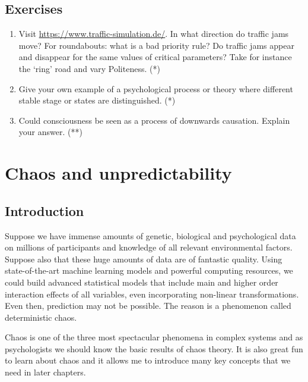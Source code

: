 \documentclass[
  a4paper,
  DIV=11,
  numbers=noendperiod]{scrreprt}
\begin{document}
\hypertarget{sec-Exercises}{%
\section{Exercises}\label{sec-Exercises}}

\begin{enumerate}
\def\labelenumi{\arabic{enumi})}
\item
  Visit \url{https://www.traffic-simulation.de/}. In what direction do
  traffic jams move? For roundabouts: what is a bad priority rule? Do
  traffic jams appear and disappear for the same values of critical
  parameters? Take for instance the `ring' road and vary Politeness. (*)
\item
  Give your own example of a psychological process or theory where
  different stable stage or states are distinguished. (*)
\item
  Could consciousness be seen as a process of downwards causation.
  Explain your answer. (**)
\end{enumerate}


\hypertarget{sec-ch2}{%
\chapter{Chaos and unpredictability}\label{sec-ch2}}

\hypertarget{sec-Introduction}{%
\section{Introduction}\label{sec-Introduction}}

Suppose we have immense amounts of genetic, biological and psychological
data on millions of participants and knowledge of all relevant
environmental factors. Suppose also that these huge amounts of data are
of fantastic quality. Using state-of-the-art machine learning models and
powerful computing resources, we could build advanced statistical models
that include main and higher order interaction effects of all variables,
even incorporating non-linear transformations. Even then, prediction may
not be possible. The reason is a phenomenon called deterministic chaos.

Chaos is one of the three most spectacular phenomena in complex systems
and as psychologists we should know the basic results of chaos theory.
It is also great fun to learn about chaos and it allows me to introduce
many key concepts that we need in later chapters.
\end{document}
